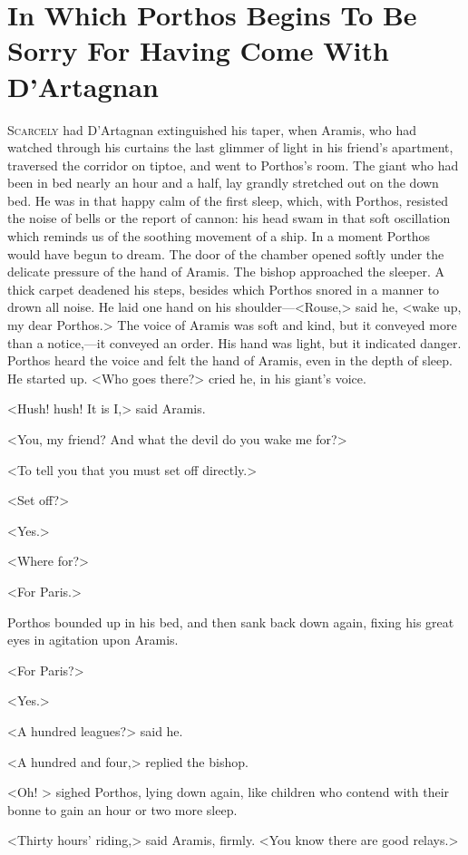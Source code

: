 \chapter{In Which Porthos Begins To Be Sorry For Having Come With D'Artagnan}


\lettrine{S}{carcely} had D'Artagnan extinguished his taper, when Aramis, who had watched through his curtains the last glimmer of light in his friend's apartment, traversed the corridor on tiptoe, and went to Porthos's room. The giant who had been in bed nearly an hour and a half, lay grandly stretched out on the down bed. He was in that happy calm of the first sleep, which, with Porthos, resisted the noise of bells or the report of cannon: his head swam in that soft oscillation which reminds us of the soothing movement of a ship. In a moment Porthos would have begun to dream. The door of the chamber opened softly under the delicate pressure of the hand of Aramis. The bishop approached the sleeper. A thick carpet deadened his steps, besides which Porthos snored in a manner to drown all noise. He laid one hand on his shoulder—<Rouse,> said he, <wake up, my dear Porthos.> The voice of Aramis was soft and kind, but it conveyed more than a notice,—it conveyed an order. His hand was light, but it indicated danger. Porthos heard the voice and felt the hand of Aramis, even in the depth of sleep. He started up. <Who goes there?> cried he, in his giant's voice.

<Hush! hush! It is I,> said Aramis.

<You, my friend? And what the devil do you wake me for?>

<To tell you that you must set off directly.>

<Set off?>

<Yes.>

<Where for?>

<For Paris.>

Porthos bounded up in his bed, and then sank back down again, fixing his great eyes in agitation upon Aramis.

<For Paris?>

<Yes.>

<A hundred leagues?> said he.

<A hundred and four,> replied the bishop.

<Oh! > sighed Porthos, lying down again, like children who contend with their bonne to gain an hour or two more sleep.

<Thirty hours' riding,> said Aramis, firmly. <You know there are good relays.>

